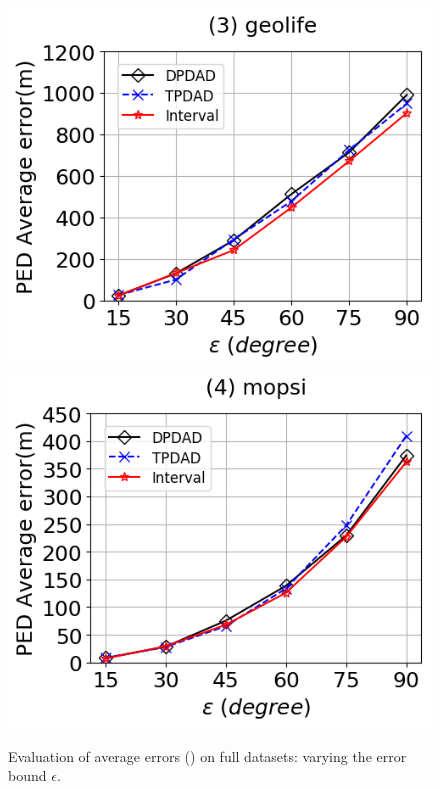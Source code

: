 \begin{figure}[tb!]
	\includegraphics[scale=0.315]{Figures/Exp-DAD-pedAveErr-epsilon-geolife.png}	\hspace{1ex}
	\includegraphics[scale=0.315]{Figures/Exp-DAD-pedAveErr-epsilon-mopsi.png}	
	\vspace{-3ex}
	\caption{\small Evaluation of average errors (\dad) on full datasets: varying the error bound $\epsilon$.}
	\label{fig:ae-dad-ped-epsilon}
	\vspace{-2ex}
\end{figure}

